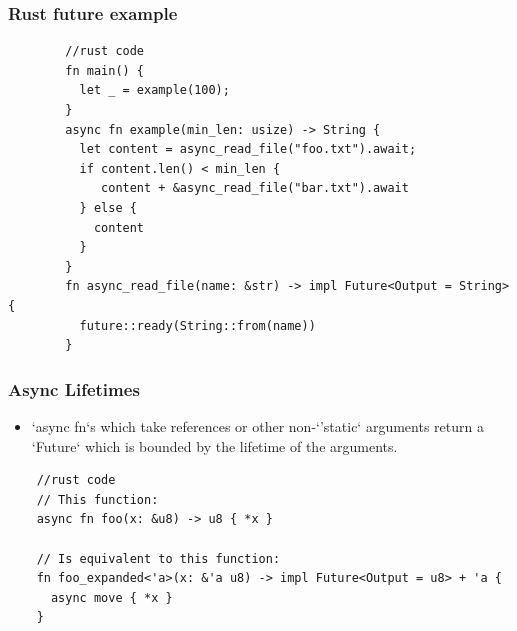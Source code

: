 \begin{frame}[fragile]
    \frametitle{Rust future example}
    \small
    \begin{block}{}
        \begin{verbatim}
        //rust code
        fn main() {
          let _ = example(100);
        }        
        async fn example(min_len: usize) -> String {
          let content = async_read_file("foo.txt").await;
          if content.len() < min_len {
             content + &async_read_file("bar.txt").await
          } else {
            content
          }
        }        
        fn async_read_file(name: &str) -> impl Future<Output = String> {
          future::ready(String::from(name))
        }
        \end{verbatim}
    \end{block}
\end{frame}

\begin{frame}[fragile]
    \frametitle{Async Lifetimes}
    \begin{itemize}
        \item `async fn`s which take references or other non-`'static` arguments return a `Future` which is bounded by the lifetime of the arguments.
    \end{itemize}
    \begin{block}{}
        \begin{verbatim}
    //rust code
    // This function:
    async fn foo(x: &u8) -> u8 { *x }
    
    // Is equivalent to this function:
    fn foo_expanded<'a>(x: &'a u8) -> impl Future<Output = u8> + 'a {
      async move { *x }
    }
        \end{verbatim}
    \end{block}
 
\end{frame}

